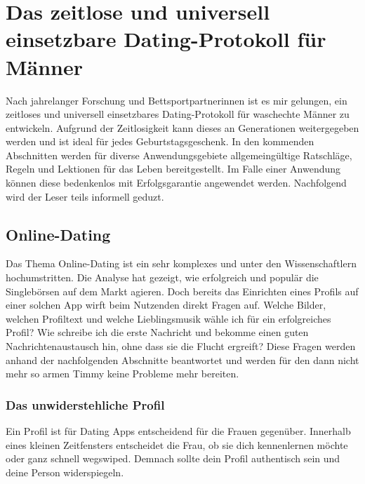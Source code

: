 \chapter{Das zeitlose und universell einsetzbare Dating-Protokoll für Männer}
\label{chapter-protokoll}

Nach jahrelanger Forschung und Bettsportpartnerinnen ist es mir gelungen, ein zeitloses und universell einsetzbares Dating-Protokoll für waschechte Männer zu entwickeln.
Aufgrund der Zeitlosigkeit kann dieses an Generationen weitergegeben werden und ist ideal für jedes Geburtstagsgeschenk.
In den kommenden Abschnitten werden für diverse Anwendungsgebiete allgemeingültige Ratschläge, Regeln und Lektionen für das Leben bereitgestellt. 
Im Falle einer Anwendung können diese bedenkenlos mit Erfolgsgarantie angewendet werden.
Nachfolgend wird der Leser teils informell geduzt.


\section{Online-Dating}

Das Thema Online-Dating ist ein sehr komplexes und unter den Wissenschaftlern hochumstritten.
Die Analyse hat gezeigt, wie erfolgreich und populär die Singlebörsen auf dem Markt agieren.
Doch bereits das Einrichten eines Profils auf einer solchen App wirft beim Nutzenden direkt Fragen auf. 
Welche Bilder, welchen Profiltext und welche Lieblingsmusik wähle ich für ein erfolgreiches Profil?
Wie schreibe ich die erste Nachricht und bekomme einen guten Nachrichtenaustausch hin, ohne dass sie die Flucht ergreift?
Diese Fragen werden anhand der nachfolgenden Abschnitte beantwortet und werden für den dann nicht mehr so armen Timmy keine Probleme mehr bereiten.


\subsection{Das unwiderstehliche Profil}

Ein Profil ist für Dating Apps entscheidend für die Frauen gegenüber.
Innerhalb eines kleinen Zeitfensters entscheidet die Frau, ob sie dich kennenlernen möchte oder ganz schnell wegswiped.
Demnach sollte dein Profil authentisch sein und deine Person widerspiegeln.

